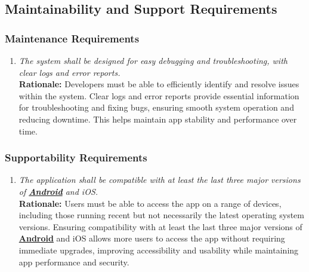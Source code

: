 \documentclass[]{article}
\begin{document}

\subsection{Maintainability and Support Requirements}
\label{sub:maintainability_and_support_requirements}

\subsubsection{Maintenance Requirements}
\label{ssub:maintenance_requirements}
\begin{enumerate}[{MS-M}1. ]
	\item \textit{The system shall be designed for easy debugging and troubleshooting, with clear logs and error reports.}
	\\ \textbf{Rationale:} Developers must be able to efficiently identify and resolve issues within the system. Clear logs and error reports provide essential information for troubleshooting and fixing bugs, ensuring smooth system operation and reducing downtime. This helps maintain app stability and performance over time.
\end{enumerate}

\subsubsection{Supportability Requirements}
\label{ssub:supportability_requirements}
\begin{enumerate}[{MS-S}1. ]
	\item \textit{The application shall be compatible with at least the last three major versions of \hyperref[Android]{\textbf{Android}} and iOS.}
	\\ \textbf{Rationale:} Users must be able to access the app on a range of devices, including those running recent but not necessarily the latest operating system versions. Ensuring compatibility with at least the last three major versions of \hyperref[Android]{\textbf{Android}} and iOS allows more users to access the app without requiring immediate upgrades, improving accessibility and usability while maintaining app performance and security.
\end{enumerate}
\end{document}
